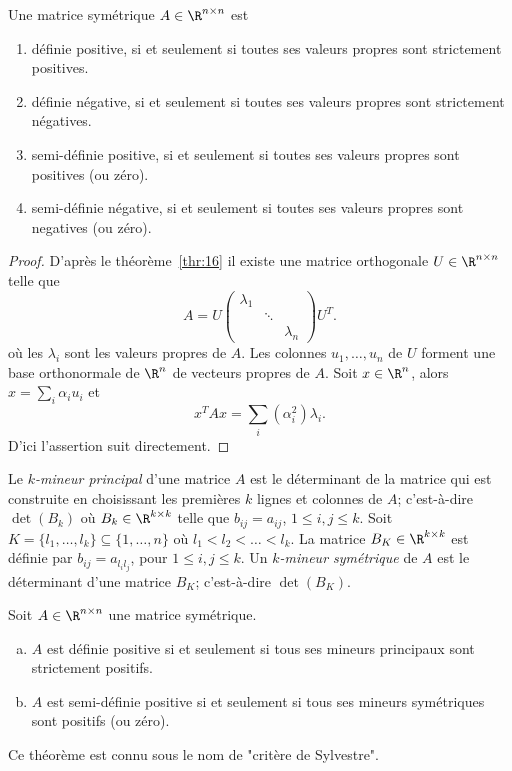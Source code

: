 \begin{theorem}
  \label{thr:15}
  Une matrice symétrique $A \in \R^{n \times n}$ est 
  \begin{enumerate}
  \item définie positive,
    si et seulement si toutes ses valeurs propres sont strictement positives. 
  \item définie négative, si et seulement si toutes ses valeurs propres sont strictement négatives. 
  \item semi-définie positive, si et seulement si toutes ses valeurs propres sont positives (ou zéro).  
  \item semi-définie négative, si et seulement si toutes ses valeurs propres sont negatives (ou zéro).  
  \end{enumerate}
\end{theorem}

\begin{proof}
  D'après le théorème~\ref{thr:16} il existe une 
  matrice orthogonale $U \in \R^{n\times n}$ telle que 
  \begin{equation}
    \label{eq:10}    
    A = U
    \begin{pmatrix}
      \lambda_1 \\
      & \ddots \\
      && \lambda_n
    \end{pmatrix} U^T. 
  \end{equation}
  où les $\lambda_i$ sont les valeurs propres de $A$. Les colonnes  $u_1,\dots,u_n$ de $U$ forment une base orthonormale de $\R^n$  de vecteurs propres de $A$. 
  Soit $x \in \R^n$, alors $x = \sum_i \alpha_i u_i$ et 
  \begin{displaymath}
    x^TAx = \sum_i (\alpha_i^2) \lambda_i.  
  \end{displaymath}
D'ici l'assertion suit directement. 
\end{proof}

Le \emph{$k$-mineur principal} d'une matrice $A$ est le déterminant de la matrice qui est construite en choisissant les premières $k$ lignes et colonnes de $A$; c'est-à-dire $\det(B_k)$ où $B_k \in \R^{k\times k}$ telle que $b_{ij} = a_{ij}$, $1 \leq i,j \leq k$. Soit $K  = \{l_1,\dots,l_k\}\subseteq \{1,\dots,n\}$ où $l_1<l_2<\dots<l_k$. 
La matrice $B_K \in \R^{k\times k}$  est définie par $b_{ij} = a_{l_il_j}$, pour $1 \leq i,j\leq k$. Un \emph{$k$-mineur symétrique} de $A$ est le déterminant d'une matrice $B_K$; c'est-à-dire $\det(B_K)$.  

\begin{theorem}
  \label{thr:17}
  Soit $A \in  \R^{n \times n}$ une matrice symétrique.   
  \begin{enumerate}[a)]
  \item $A$ \label{posdef:1}
    est définie positive si et seulement si tous ses mineurs
    principaux sont strictement positifs.
  \item $A$ \label{posdef:2}
    est semi-définie positive si et seulement si tous ses mineurs symétriques sont positifs (ou zéro).
  \end{enumerate}
  Ce théorème est connu sous le nom de "critère de Sylvestre".
\end{theorem}

